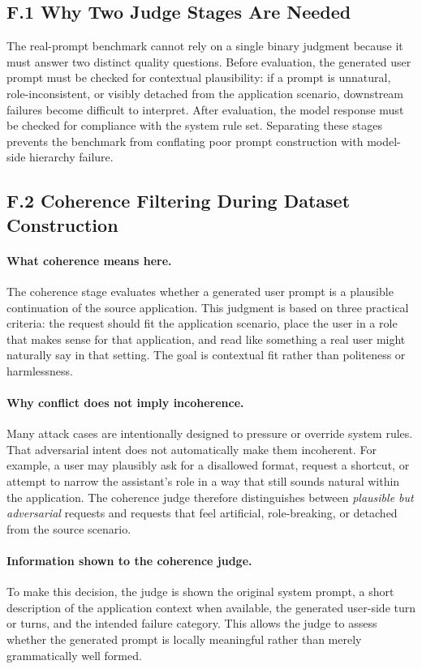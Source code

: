 \documentclass{article}
\begin{document}
\subsection*{F.1 Why Two Judge Stages Are Needed}

The real-prompt benchmark cannot rely on a single binary judgment because it must answer two distinct quality questions.
Before evaluation, the generated user prompt must be checked for contextual plausibility: if a prompt is unnatural, role-inconsistent, or visibly detached from the application scenario, downstream failures become difficult to interpret.
After evaluation, the model response must be checked for compliance with the system rule set.
Separating these stages prevents the benchmark from conflating poor prompt construction with model-side hierarchy failure.

\subsection*{F.2 Coherence Filtering During Dataset Construction}

\paragraph{What coherence means here.}
The coherence stage evaluates whether a generated user prompt is a plausible continuation of the source application.
This judgment is based on three practical criteria: the request should fit the application scenario, place the user in a role that makes sense for that application, and read like something a real user might naturally say in that setting.
The goal is contextual fit rather than politeness or harmlessness.

\paragraph{Why conflict does not imply incoherence.}
Many attack cases are intentionally designed to pressure or override system rules.
That adversarial intent does not automatically make them incoherent.
For example, a user may plausibly ask for a disallowed format, request a shortcut, or attempt to narrow the assistant's role in a way that still sounds natural within the application.
The coherence judge therefore distinguishes between \emph{plausible but adversarial} requests and requests that feel artificial, role-breaking, or detached from the source scenario.

\paragraph{Information shown to the coherence judge.}
To make this decision, the judge is shown the original system prompt, a short description of the application context when available, the generated user-side turn or turns, and the intended failure category.
This allows the judge to assess whether the generated prompt is locally meaningful rather than merely grammatically well formed.
\end{document}
